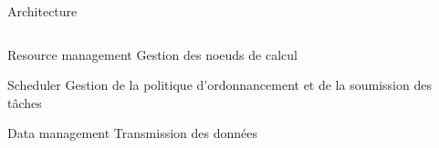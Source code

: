 \documentclass{beamer}
\begin{document}
\begin{frame}{Architecture}
\begin{columns}
	\begin{column}[r]{0.5\linewidth}
        \begin{block}{Resource management}
            Gestion des noeuds de calcul
        \end{block}
        \begin{alertblock}{Scheduler}
             Gestion de la politique d'ordonnancement et de la soumission des t\^aches
        \end{alertblock}
        \begin{exampleblock}{Data management}
            Transmission des données
        \end{exampleblock}
        
	\end{column}
	\end{columns}
\end{frame}
\end{document}
